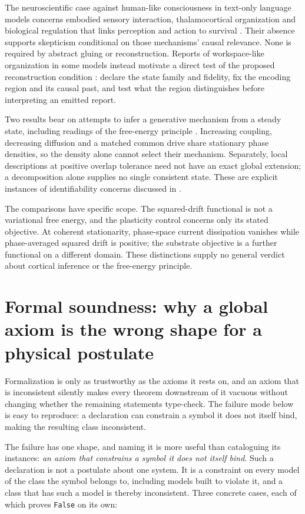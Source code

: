 \documentclass{article}
\renewcommand{\cite}[1]{\citep{#1}}
\begin{document}
The neuroscientific case against human-like consciousness in text-only language models concerns embodied sensory interaction, thalamocortical organization and biological regulation that links perception and action to survival \cite{aru2023}. Their absence supports skepticism conditional on those mechanisms' causal relevance. None is required by abstract gluing or reconstruction. Reports of workspace-like organization in some models instead motivate a direct test of the proposed reconstruction condition \cite{gurnee2026}: declare the state family and fidelity, fix the encoding region and its causal past, and test what the region distinguishes before interpreting an emitted report.

Two results bear on attempts to infer a generative mechanism from a steady state, including readings of the free-energy principle \cite{friston2010}. Increasing coupling, decreasing diffusion and a matched common drive share stationary phase densities, so the density alone cannot select their mechanism. Separately, local descriptions at positive overlap tolerance need not have an exact global extension; a decomposition alone supplies no single consistent state. These are explicit instances of identifiability concerns discussed in \cite{aguilera2022,biehl2021,bruineberg2022}.

The comparisons have specific scope. The squared-drift functional is not a variational free energy, and the plasticity control concerns only its stated objective. At coherent stationarity, phase-space current dissipation vanishes while phase-averaged squared drift is positive; the substrate objective is a further functional on a different domain. These distinctions supply no general verdict about cortical inference or the free-energy principle.

\section{Formal soundness: why a global axiom is the wrong shape for a physical postulate}
\label{sec:soundness}

Formalization is only as trustworthy as the axioms it rests on, and an axiom that is inconsistent silently makes every theorem downstream of it vacuous without changing whether the remaining statements type-check. The failure mode below is easy to reproduce: a declaration can constrain a symbol it does not itself bind, making the resulting class inconsistent.

The failure has one shape, and naming it is more useful than cataloguing its instances: \emph{an axiom that constrains a symbol it does not itself bind}. Such a declaration is not a postulate about one system. It is a constraint on every model of the class the symbol belongs to, including models built to violate it, and a class that has such a model is thereby inconsistent. Three concrete cases, each of which proves \texttt{False} on its own:
\end{document}
